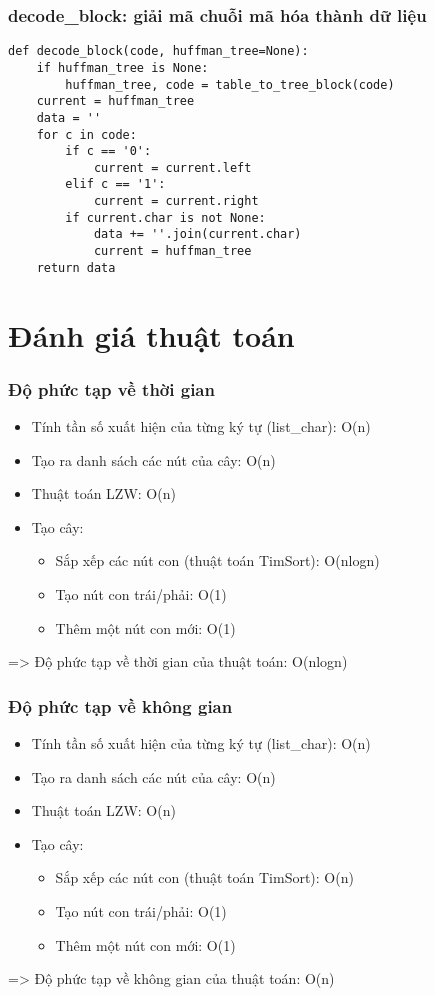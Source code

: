     \subsubsection{decode\_block: giải mã chuỗi mã hóa thành dữ liệu}
        \begin{lstlisting}
def decode_block(code, huffman_tree=None):
    if huffman_tree is None:
        huffman_tree, code = table_to_tree_block(code)
    current = huffman_tree
    data = ''
    for c in code:
        if c == '0':
            current = current.left
        elif c == '1':
            current = current.right
        if current.char is not None:
            data += ''.join(current.char)
            current = huffman_tree
    return data
        \end{lstlisting}

\section{Đánh giá thuật toán}
\subsubsection{Độ phức tạp về thời gian}
    \begin{itemize}
        \item Tính tần số xuất hiện của từng ký tự (list\_char): O(n)
        \item Tạo ra danh sách các nút của cây: O(n)
        \item Thuật toán LZW: O(n)
        \item Tạo cây:
            \begin{itemize}
                \item Sắp xếp các nút con (thuật toán TimSort): O(nlogn)
                \item Tạo nút con trái/phải: O(1)
                \item Thêm một nút con mới: O(1) 
            \end{itemize}
    \end{itemize}
    => Độ phức tạp về thời gian của thuật toán: O(nlogn)
\subsubsection{Độ phức tạp về không gian}
    \begin{itemize}
        \item Tính tần số xuất hiện của từng ký tự (list\_char): O(n)
        \item Tạo ra danh sách các nút của cây: O(n)
        \item Thuật toán LZW: O(n)
        \item Tạo cây:
            \begin{itemize}
                \item Sắp xếp các nút con (thuật toán TimSort): O(n)
                \item Tạo nút con trái/phải: O(1)
                \item Thêm một nút con mới: O(1)
            \end{itemize}
    \end{itemize}
    => Độ phức tạp về không gian của thuật toán: O(n)

